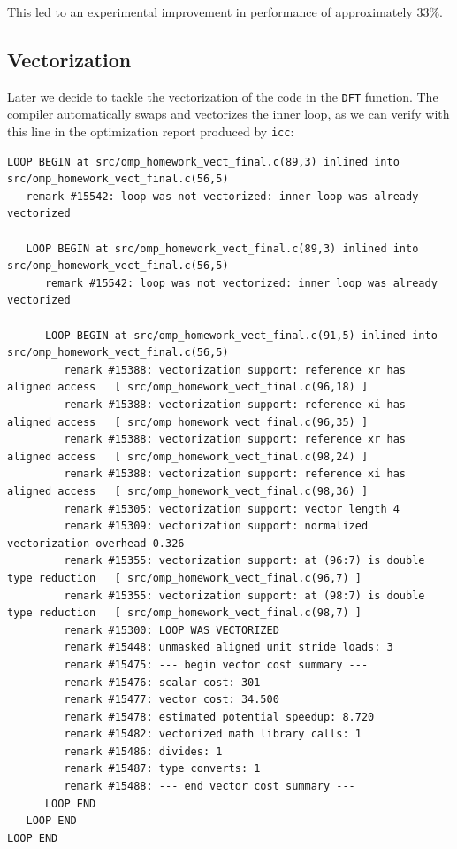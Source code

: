 \documentclass{article}
\begin{document}
This led to an experimental improvement in performance of approximately 33\%.

\subsection{Vectorization}

Later we decide to tackle the vectorization of the code in the \verb|DFT| function.
The compiler automatically swaps and vectorizes the inner loop, as we can verify with this line in the optimization report produced by \verb|icc|:

\begin{verbatim}
LOOP BEGIN at src/omp_homework_vect_final.c(89,3) inlined into src/omp_homework_vect_final.c(56,5)
   remark #15542: loop was not vectorized: inner loop was already vectorized

   LOOP BEGIN at src/omp_homework_vect_final.c(89,3) inlined into src/omp_homework_vect_final.c(56,5)
      remark #15542: loop was not vectorized: inner loop was already vectorized

      LOOP BEGIN at src/omp_homework_vect_final.c(91,5) inlined into src/omp_homework_vect_final.c(56,5)
         remark #15388: vectorization support: reference xr has aligned access   [ src/omp_homework_vect_final.c(96,18) ]
         remark #15388: vectorization support: reference xi has aligned access   [ src/omp_homework_vect_final.c(96,35) ]
         remark #15388: vectorization support: reference xr has aligned access   [ src/omp_homework_vect_final.c(98,24) ]
         remark #15388: vectorization support: reference xi has aligned access   [ src/omp_homework_vect_final.c(98,36) ]
         remark #15305: vectorization support: vector length 4
         remark #15309: vectorization support: normalized vectorization overhead 0.326
         remark #15355: vectorization support: at (96:7) is double type reduction   [ src/omp_homework_vect_final.c(96,7) ]
         remark #15355: vectorization support: at (98:7) is double type reduction   [ src/omp_homework_vect_final.c(98,7) ]
         remark #15300: LOOP WAS VECTORIZED
         remark #15448: unmasked aligned unit stride loads: 3 
         remark #15475: --- begin vector cost summary ---
         remark #15476: scalar cost: 301 
         remark #15477: vector cost: 34.500 
         remark #15478: estimated potential speedup: 8.720 
         remark #15482: vectorized math library calls: 1 
         remark #15486: divides: 1 
         remark #15487: type converts: 1 
         remark #15488: --- end vector cost summary ---
      LOOP END
   LOOP END
LOOP END
\end{verbatim}
\end{document}
